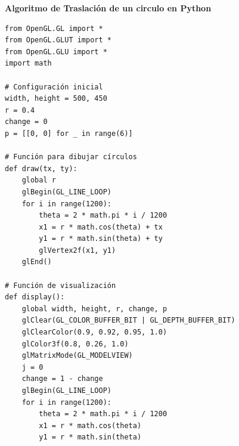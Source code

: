 \documentclass[a4paper]{article}
\begin{document}
\Large{\textbf{Algoritmo de Traslación de un circulo en Python}}\\[-0.4cm]
\begin{center}
\begin{mycodebox}
\begin{lstlisting}
from OpenGL.GL import *
from OpenGL.GLUT import *
from OpenGL.GLU import *
import math

# Configuración inicial
width, height = 500, 450
r = 0.4
change = 0
p = [[0, 0] for _ in range(6)]

# Función para dibujar círculos
def draw(tx, ty):
    global r
    glBegin(GL_LINE_LOOP)
    for i in range(1200):
        theta = 2 * math.pi * i / 1200
        x1 = r * math.cos(theta) + tx
        y1 = r * math.sin(theta) + ty
        glVertex2f(x1, y1)
    glEnd()

# Función de visualización
def display():
    global width, height, r, change, p
    glClear(GL_COLOR_BUFFER_BIT | GL_DEPTH_BUFFER_BIT)
    glClearColor(0.9, 0.92, 0.95, 1.0) 
    glColor3f(0.8, 0.26, 1.0)  
    glMatrixMode(GL_MODELVIEW)
    j = 0
    change = 1 - change
    glBegin(GL_LINE_LOOP)
    for i in range(1200):
        theta = 2 * math.pi * i / 1200
        x1 = r * math.cos(theta)
        y1 = r * math.sin(theta) 
\end{lstlisting}
\end{mycodebox}
\end{center}
\end{document}
